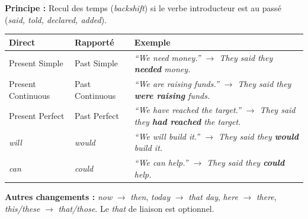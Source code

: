 \documentclass[11pt]{article}
\newcommand{\eng}[1]{\ifmmode\text{\textit{#1}}\else\begingroup\selectlanguage{english}\itshape #1\endgroup\fi}
\begin{document}
\begin{propriete}
\textbf{Principe :} Recul des temps (\emph{backshift}) si le verbe introducteur est au passé (\emph{said, told, declared, added}).
\begin{center}
\begin{tabular}{|l|l|l|}
\hline
\textbf{Direct} & \textbf{Rapporté} & \textbf{Exemple} \\
\hline
Present Simple & Past Simple & \eng{“We need money.”} $\rightarrow$ \eng{They said they \textbf{needed} money.} \\
Present Continuous & Past Continuous & \eng{“We are raising funds.”} $\rightarrow$ \eng{They said they \textbf{were raising} funds.} \\
Present Perfect & Past Perfect & \eng{“We have reached the target.”} $\rightarrow$ \eng{They said they \textbf{had reached} the target.} \\
\emph{will} & \emph{would} & \eng{“We will build it.”} $\rightarrow$ \eng{They said they \textbf{would} build it.} \\
\emph{can} & \emph{could} & \eng{“We can help.”} $\rightarrow$ \eng{They said they \textbf{could} help.} \\
\hline
\end{tabular}
\end{center}
\textbf{Autres changements :} \emph{now} $\rightarrow$ \emph{then}, \emph{today} $\rightarrow$ \emph{that day}, \emph{here} $\rightarrow$ \emph{there}, \emph{this/these} $\rightarrow$ \emph{that/those}. Le \emph{that} de liaison est optionnel.
\end{propriete}
\end{document}
